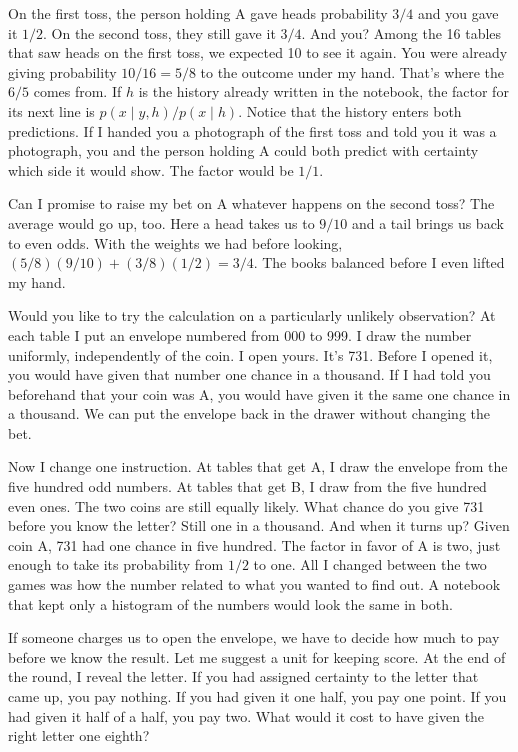 On the first toss, the person holding A gave heads probability $3/4$ and you gave it $1/2$. On the second toss, they still gave it $3/4$. And you? Among the 16 tables that saw heads on the first toss, we expected 10 to see it again. You were already giving probability $10/16=5/8$ to the outcome under my hand. That's where the $6/5$ comes from. If $h$ is the history already written in the notebook, the factor for its next line is $p(x\mid y,h)/p(x\mid h)$. Notice that the history enters both predictions. If I handed you a photograph of the first toss and told you it was a photograph, you and the person holding A could both predict with certainty which side it would show. The factor would be $1/1$.

Can I promise to raise my bet on A whatever happens on the second toss? The average would go up, too. Here a head takes us to $9/10$ and a tail brings us back to even odds. With the weights we had before looking, $(5/8)(9/10)+(3/8)(1/2)=3/4$. The books balanced before I even lifted my hand.

Would you like to try the calculation on a particularly unlikely observation? At each table I put an envelope numbered from 000 to 999. I draw the number uniformly, independently of the coin. I open yours. It's 731. Before I opened it, you would have given that number one chance in a thousand. If I had told you beforehand that your coin was A, you would have given it the same one chance in a thousand. We can put the envelope back in the drawer without changing the bet.

Now I change one instruction. At tables that get A, I draw the envelope from the five hundred odd numbers. At tables that get B, I draw from the five hundred even ones. The two coins are still equally likely. What chance do you give 731 before you know the letter? Still one in a thousand. And when it turns up? Given coin A, 731 had one chance in five hundred. The factor in favor of A is two, just enough to take its probability from $1/2$ to one. All I changed between the two games was how the number related to what you wanted to find out. A notebook that kept only a histogram of the numbers would look the same in both.

If someone charges us to open the envelope, we have to decide how much to pay before we know the result. Let me suggest a unit for keeping score. At the end of the round, I reveal the letter. If you had assigned certainty to the letter that came up, you pay nothing. If you had given it one half, you pay one point. If you had given it half of a half, you pay two. What would it cost to have given the right letter one eighth?

